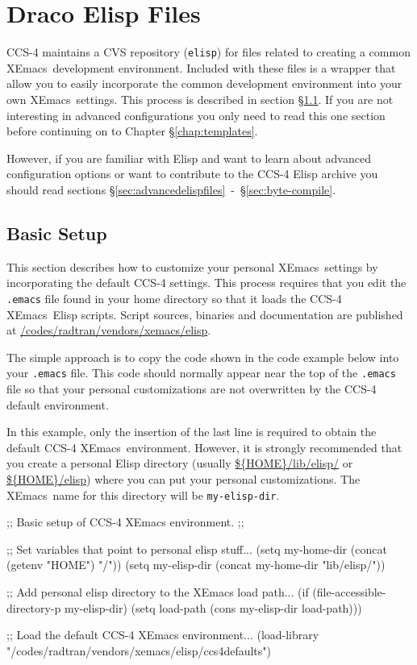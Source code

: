 \documentclass[11pt]{nmemo}
\newcommand{\comp}[1]{{\normalfont\texttt{\footnotesize{#1}}}}
\newcommand{\xemacs}{{\normalfont\sffamily XEmacs}}
\newenvironment{codeExample}
{\footnotesize 
  \VerbatimEnvironment
  \begin{SaveVerbatim}{\mycode}}%
  {\end{SaveVerbatim}%
  \noindent%
  \parashade[.950]{sharpcorners}{\gdef\outlineboxwidth{.5}%
    \UseVerbatim{\mycode}}\normalsize}
\begin{document}

\section{Draco Elisp Files}
\label{chap:elispfiles}

CCS-4 maintains a CVS repository (\comp{elisp}) for files related to
creating a common \xemacs\ development environment.  Included with
these files is a wrapper that allow you to easily incorporate the
common development environment into your own \xemacs\ settings.  This
process is described in section \S\ref{sec:basicelispfiles}.  If you
are not interesting in advanced configurations you only need to read
this one section before continuing on to Chapter
\S\ref{chap:templates}.

However, if you are familiar with Elisp and want to learn about
advanced configuration options or want to contribute to the CCS-4
Elisp archive you should read sections
\S\ref{sec:advancedelispfiles}~-~\S\ref{sec:byte-compile}. 

\subsection{Basic Setup}
\label{sec:basicelispfiles}

This section describes how to customize your personal \xemacs\ 
settings by incorporating the default CCS-4 settings.  This process
requires that you edit the \comp{.emacs} file found in your home
directory so that it loads the CCS-4 \xemacs\ Elisp scripts.  Script
sources, binaries and documentation are published at
\url{/codes/radtran/vendors/xemacs/elisp}.

The simple approach is to copy the code shown in the code example
below into your \comp{.emacs} file.  This code should normally appear
near the top of the \comp{.emacs} file so that your personal
customizations are not overwritten by the CCS-4 default environment.

In this example, only the insertion of the last line is required to
obtain the default CCS-4 \xemacs\ environment.  However, it is
strongly recommended that you create a personal Elisp directory
(usually \url{${HOME}/lib/elisp/} or \url{${HOME}/elisp}) where you
can put your personal customizations. The \xemacs\ name for this
directory will be \comp{my-elisp-dir}.

\begin{codeExample}
;; Basic setup of CCS-4 XEmacs environment.
;;

;; Set variables that point to personal elisp stuff...
(setq my-home-dir (concat (getenv "HOME") "/"))
(setq my-elisp-dir (concat my-home-dir "lib/elisp/"))

;; Add personal elisp directory to the XEmacs load path...
(if (file-accessible-directory-p my-elisp-dir)
   (setq load-path (cons my-elisp-dir load-path)))

;; Load the default CCS-4 XEmacs environment...
(load-library "/codes/radtran/vendors/xemacs/elisp/ccs4defaults")
\end{codeExample}
\end{document}
